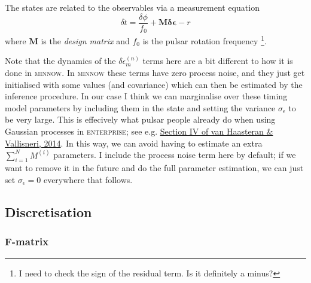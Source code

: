 \documentclass[]{scrartcl}
\begin{document}
\noindent The states are related to the observables via a measurement equation
\begin{equation}
	\delta t = \frac{\delta \phi}{f_0} + \mathbf{M} \mathbf{\delta \epsilon} - r
\end{equation}
where  $\mathbf{M}$ is the \textit{design matrix} and $f_0$ is the pulsar rotation frequency \footnote{I need to check the sign of the residual term. Is it definitely a minus?}. \newline 


\noindent Note that the dynamics of the $\delta \epsilon^{(n)}_{m}$ terms here are a bit different to how it is done in \textsc{minnow}. In \textsc{minnow} these terms have zero process noise, and they just get initialised with some values (and covariance) which can then be estimated by the inference procedure. In our case I think we can marginalise over these timing model parameters by including them in the state and setting the variance $\sigma_\epsilon$ to be very large. This is effecively what pulsar people already do when using Gaussian processes in \textsc{enterprise}; see e.g. \href{https://arxiv.org/abs/1407.1838}{Section IV of van Haasteran \& Vallisneri, 2014}. In this way, we can avoid having to estimate an extra $\sum_{i=1}^{N} M^{(i)}$ parameters. I include the process noise term here by default; if we want to remove it in the future and do the full parameter estimation, we can just set $\sigma_\epsilon=0$ everywhere that follows.




\subsection{Discretisation}

\subsubsection{F-matrix}
	
\end{document}
